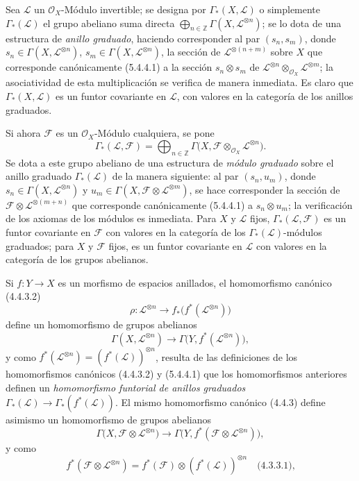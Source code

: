\begin{env}[5.4.6]
\label{0.5.4.6-fr}
Sea $\mathcal{L}$ un $\mathcal{O}_X$-Módulo invertible; se designa por
$\Gamma_*(X,\mathcal{L})$ o simplemente $\Gamma_*(\mathcal{L})$ el grupo
abeliano suma directa
$\bigoplus_{n\in\mathbb{Z}}\Gamma(X,\mathcal{L}^{\otimes n})$; se lo dota
de una estructura de \emph{anillo graduado}, haciendo corresponder al par
$(s_n,s_m)$, donde $s_n\in\Gamma(X,\mathcal{L}^{\otimes n})$,
$s_m\in\Gamma(X,\mathcal{L}^{\otimes n})$, la sección de
$\mathcal{L}^{\otimes(n+m)}$ sobre $X$ que corresponde canónicamente
(5.4.4.1) a la sección $s_n\otimes s_m$ de
$\mathcal{L}^{\otimes n}\otimes_{\mathcal{O}_X}\mathcal{L}^{\otimes m}$;
la asociatividad de esta multiplicación se verifica de manera inmediata. Es
claro que $\Gamma_*(X,\mathcal{L})$ es un funtor covariante en
$\mathcal{L}$, con valores en la categoría de los anillos graduados.

Si ahora $\mathcal{F}$ es un $\mathcal{O}_X$-Módulo cualquiera, se pone
\[
  \Gamma_*(\mathcal{L},\mathcal{F})
  =\bigoplus_{n\in\mathbb{Z}}
   \Gamma\bigl(X,
     \mathcal{F}\otimes_{\mathcal{O}_X}\mathcal{L}^{\otimes n}\bigr).
\]
Se dota a este grupo abeliano de una estructura de \emph{módulo graduado} sobre
el anillo graduado $\Gamma_*(\mathcal{L})$ de la manera siguiente: al par
$(s_n,u_m)$, donde $s_n\in\Gamma(X,\mathcal{L}^{\otimes n})$ y
$u_m\in\Gamma(X,
\mathcal{F}\otimes\mathcal{L}^{\otimes m})$, se hace
corresponder la sección de
$\mathcal{F}\otimes\mathcal{L}^{\otimes(m+n)}$ que corresponde
canónicamente (5.4.4.1) a $s_n\otimes u_m$; la verificación de los axiomas de
los módulos es inmediata. Para $X$ y $\mathcal{L}$ fijos,
$\Gamma_*(\mathcal{L},\mathcal{F})$ es un funtor covariante en
$\mathcal{F}$ con valores en la categoría de los
$\Gamma_*(\mathcal{L})$-módulos graduados; para $X$ y $\mathcal{F}$ fijos,
es un funtor covariante en $\mathcal{L}$ con valores en la categoría de los
grupos abelianos.

Si $f:Y\to X$ es un morfismo de espacios anillados, el homomorfismo canónico
(4.4.3.2)
\[
  \rho:\mathcal{L}^{\otimes n}
  \longrightarrow
  f_*\bigl(f^*(\mathcal{L}^{\otimes n})\bigr)
\]
define un homomorfismo de grupos abelianos
\[
  \Gamma(X,\mathcal{L}^{\otimes n})
  \longrightarrow
  \Gamma\bigl(Y,f^*(\mathcal{L}^{\otimes n})\bigr),
\]
y como
$f^*(\mathcal{L}^{\otimes n})=(f^*(\mathcal{L}))^{\otimes n}$, resulta de las
definiciones de los homomorfismos canónicos (4.4.3.2) y (5.4.4.1) que los
homomorfismos anteriores definen un \emph{homomorfismo funtorial
de anillos graduados}
$\Gamma_*(\mathcal{L})\to\Gamma_*(f^*(\mathcal{L}))$. El mismo homomorfismo
canónico (4.4.3) define asimismo un homomorfismo de grupos abelianos
\[
  \Gamma\bigl(X,
    \mathcal{F}\otimes\mathcal{L}^{\otimes n}\bigr)
  \longrightarrow
  \Gamma\bigl(Y,
    f^*(\mathcal{F}\otimes\mathcal{L}^{\otimes n})\bigr),
\]
y como
\[
  f^*(\mathcal{F}\otimes\mathcal{L}^{\otimes n})
  =f^*(\mathcal{F})\otimes
   (f^*(\mathcal{L}))^{\otimes n}
  \quad\text{(4.3.3.1),}
\]


\end{env}
